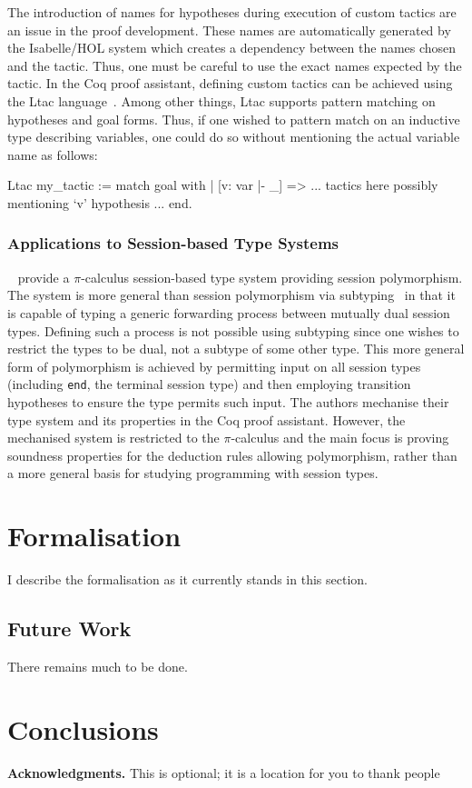\documentclass{mpaper}
\begin{document}
The introduction of names for hypotheses during execution of custom tactics
are an issue in the proof development. These names are automatically generated
by the Isabelle/HOL system which creates a dependency between the names chosen
and the tactic. Thus, one must be careful to use the exact names expected by
the tactic. In the Coq proof assistant, defining custom tactics can be
achieved using the Ltac language~\cite{Delahaye:2000:TLS}. Among other things,
Ltac supports pattern matching on hypotheses and goal forms. Thus, if one
wished to pattern match on an inductive type describing variables, one could
do so without mentioning the actual variable name as follows:

\begin{coq}
Ltac my_tactic :=
  match goal with
  | [v: var |- _] => ... tactics here possibly mentioning `v' hypothesis ...
  end.
\end{coq}

\subsubsection{Applications to Session-based Type Systems}\label{sec:asts}

\citeauthor{Goto:2014}~\cite{Goto:2014} provide a $\pi$-calculus session-based
type system providing session polymorphism. The system is more general than
session polymorphism via subtyping~\cite{Gay:2005:SST} in that it is capable
of typing a generic forwarding process between mutually dual session
types. Defining such a process is not possible using subtyping since one
wishes to restrict the types to be dual, not a subtype of some other
type. This more general form of polymorphism is achieved by permitting input
on all session types (including \lstinline{end}, the terminal session type)
and then employing transition hypotheses to ensure the type permits such
input. The authors mechanise their type system and its properties in the Coq
proof assistant. However, the mechanised system is restricted to the
$\pi$-calculus and the main focus is proving soundness properties for the
deduction rules allowing polymorphism, rather than a more general basis for
studying programming with session types.

\section{Formalisation}

I describe the formalisation as it currently stands in this section.


\subsection{Future Work}

There remains much to be done.

\section{Conclusions}


{\bf Acknowledgments.}
This is optional; it is a location for you to thank people

\printbibliography
\end{document}
